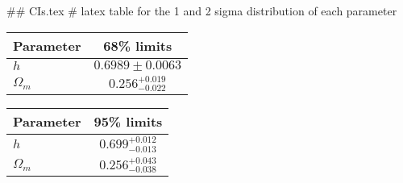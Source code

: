 ## CIs.tex
# latex table for the 1 and 2 sigma distribution of each parameter

\begin{tabular} { l  c}
 Parameter &  68\% limits\\
\hline
{\boldmath$h              $} & $0.6989\pm 0.0063          $\\
{\boldmath$\Omega_m       $} & $0.256^{+0.019}_{-0.022}   $\\
\hline
\end{tabular}

\begin{tabular} { l  c}
 Parameter &  95\% limits\\
\hline
{\boldmath$h              $} & $0.699^{+0.012}_{-0.013}   $\\
{\boldmath$\Omega_m       $} & $0.256^{+0.043}_{-0.038}   $\\
\hline
\end{tabular}

